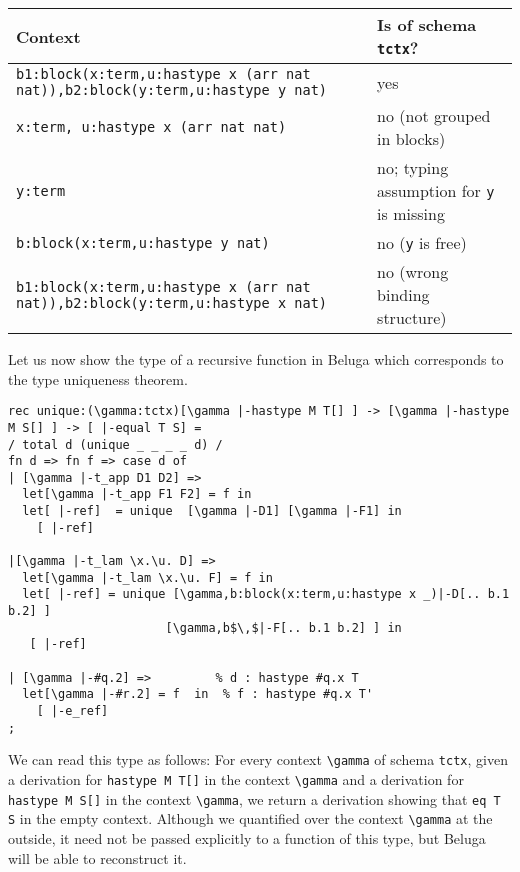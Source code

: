 \begin{small}
\begin{center}
\begin{tabular}{p{8.65cm}@{}|@{~}p{6.25cm}}
\hspace{2cm}Context & \hspace{1.5cm}Is of schema \lstinline!tctx!?\\
\hline
\lstinline!b1:block(x:term,u:hastype x (arr nat nat)),!\newline\lstinline!b2:block(y:term,u:hastype y nat)!
& yes \\ \hline
\lstinline!x:term, u:hastype x (arr nat nat)! & no (not grouped in blocks)
\\\hline
\lstinline!y:term! & no; typing assumption for \lstinline!y! is missing\\\hline
\lstinline!b:block(x:term,u:hastype y nat)! & no (\lstinline!y! is free) \\
\hline
\lstinline!b1:block(x:term,u:hastype x (arr nat nat)),!\newline\lstinline!b2:block(y:term,u:hastype x nat)!
& no (wrong binding structure)
\end{tabular}
\end{center}
\end{small}


Let us now show the type of a recursive function in Beluga which
corresponds to the type uniqueness theorem.


\begin{lstlisting}[caption={Type Uniqueness Proof},label=list:8-6,captionpos=b,float,abovecaptionskip=-\medskipamount]
rec unique:(\gamma:tctx)[\gamma |-hastype M T[] ] -> [\gamma |-hastype M S[] ] -> [ |-equal T S] =
/ total d (unique _ _ _ _ d) /
fn d => fn f => case d of
| [\gamma |-t_app D1 D2] =>
  let[\gamma |-t_app F1 F2] = f in
  let[ |-ref]  = unique  [\gamma |-D1] [\gamma |-F1] in
    [ |-ref]

|[\gamma |-t_lam \x.\u. D] =>
  let[\gamma |-t_lam \x.\u. F] = f in
  let[ |-ref] = unique [\gamma,b:block(x:term,u:hastype x _)|-D[.. b.1 b.2] ]
                      [\gamma,b$\,$|-F[.. b.1 b.2] ] in
   [ |-ref]

| [\gamma |-#q.2] =>         % d : hastype #q.x T
  let[\gamma |-#r.2] = f  in  % f : hastype #q.x T'
    [ |-e_ref]
;
\end{lstlisting}


We can read this type as follows: For every context \lstinline!\gamma! of
schema \lstinline!tctx!, given a derivation for
\lstinline!hastype M T[]! in the context \lstinline!\gamma! and a derivation for
\lstinline!hastype M S[]! in the context \lstinline!\gamma!, we return a
derivation showing that \lstinline!eq T S! in the empty context.
Although we quantified over the context \lstinline!\gamma! at the outside,
it need not be passed explicitly to a function of this type, but
Beluga will be able to reconstruct it.

